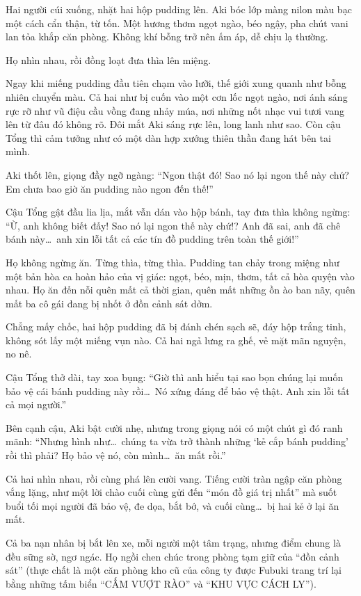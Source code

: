 \documentclass[../main.tex]{subfiles}
\begin{document}
Hai người cúi xuống, nhặt hai hộp pudding lên. Aki bóc lớp màng nilon màu bạc một cách cẩn thận, từ tốn. Một hương thơm ngọt ngào, béo ngậy, pha chút vani lan tỏa khắp căn phòng. Không khí bỗng trở nên ấm áp, dễ chịu lạ thường.

Họ nhìn nhau, rồi đồng loạt đưa thìa lên miệng.

Ngay khi miếng pudding đầu tiên chạm vào lưỡi, thế giới xung quanh như bỗng nhiên chuyển màu. Cả hai như bị cuốn vào một cơn lốc ngọt ngào, nơi ánh sáng rực rỡ như vũ điệu cầu vồng đang nhảy múa, nơi những nốt nhạc vui tươi vang lên từ đâu đó không rõ. Đôi mắt Aki sáng rực lên, long lanh như sao. Còn cậu Tổng thì cảm tưởng như có một dàn hợp xướng thiên thần đang hát bên tai mình.

Aki thốt lên, giọng đầy ngỡ ngàng: ``Ngon thật đó! Sao nó lại ngon thế này chứ? Em chưa bao giờ ăn pudding nào ngon đến thế!''

Cậu Tổng gật đầu lia lịa, mắt vẫn dán vào hộp bánh, tay đưa thìa không ngừng: ``Ừ, anh không biết đấy! Sao nó lại ngon thế này chứ!? Anh đã sai, anh đã chê bánh này\dots\ anh xin lỗi tất cả các tín đồ pudding trên toàn thế giới!''

Họ không ngừng ăn. Từng thìa, từng thìa. Pudding tan chảy trong miệng như một bản hòa ca hoàn hảo của vị giác: ngọt, béo, mịn, thơm, tất cả hòa quyện vào nhau. Họ ăn đến nỗi quên mất cả thời gian, quên mất những ồn ào ban nãy, quên mất ba cô gái đang bị nhốt ở đồn cảnh sát dởm.

Chẳng mấy chốc, hai hộp pudding đã bị đánh chén sạch sẽ, đáy hộp trắng tinh, không sót lấy một miếng vụn nào. Cả hai ngả lưng ra ghế, vẻ mặt mãn nguyện, no nê.

Cậu Tổng thở dài, tay xoa bụng: ``Giờ thì anh hiểu tại sao bọn chúng lại muốn bảo vệ cái bánh pudding này rồi\dots\ Nó xứng đáng để bảo vệ thật. Anh xin lỗi tất cả mọi người.''

Bên cạnh cậu, Aki bật cười nhẹ, nhưng trong giọng nói có một chút gì đó ranh mãnh: ``Nhưng hình như\dots\ chúng ta vừa trở thành những `kẻ cắp bánh pudding' rồi thì phải? Họ bảo vệ nó, còn mình\dots\ ăn mất rồi.''

Cả hai nhìn nhau, rồi cùng phá lên cười vang. Tiếng cười tràn ngập căn phòng vắng lặng, như một lời chào cuối cùng gửi đến ``món đồ giá trị nhất'' mà suốt buổi tối mọi người đã bảo vệ, đe dọa, bắt bớ, và cuối cùng\dots\ bị hai kẻ ở lại ăn mất.

\ct

Cả ba nạn nhân bị bắt lên xe, mỗi người một tâm trạng, nhưng điểm chung là đều sững sờ, ngơ ngác. Họ ngồi chen chúc trong phòng tạm giữ của ``đồn cảnh sát'' (thực chất là một căn phòng kho cũ của công ty được Fubuki trang trí lại bằng những tấm biển ``CẤM VƯỢT RÀO'' và ``KHU VỰC CÁCH LY'').
\end{document}
